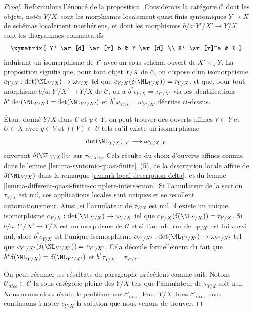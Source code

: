 \begin{proof}
Reformulons l'énoncé de la proposition. Considérons la catégorie
$\mathcal{C}$ dont les objets, notés $Y/X$, sont les morphismes localement quasi-finis syntomiques
$Y \to X$ de schémas localement noethériens, et dont les morphismes
$b/a : Y'/X' \to Y/X$ sont les diagrammes commutatifs
$$
\xymatrix{
Y' \ar[d] \ar[r]_b & Y \ar[d] \\
X' \ar[r]^a & X
}
$$
induisant un isomorphisme de $Y'$ avec un sous-schéma ouvert de
$X' \times_X Y$. La proposition signifie que, pour tout objet
$Y/X$ de $\mathcal{C}$, on dispose d'un isomorphisme
$c_{Y/X} : \det(\NL_{Y/X}) \to \omega_{Y/X}$
tel que $c_{Y/X}(\delta(\NL_{Y/X})) = \tau_{Y/X}$,
et que, pour tout morphisme $b/a : Y'/X' \to Y/X$ de $\mathcal{C}$, on a
$b^*c_{Y/X} = c_{Y'/X'}$ via les identifications
$b^*\det(\NL_{Y/X}) = \det(\NL_{Y'/X'})$ et
$b^*\omega_{Y/X} = \omega_{Y'/X'}$ décrites ci-dessus.

\medskip\noindent
Étant donné $Y/X$ dans $\mathcal{C}$ et $y \in Y$, on peut trouver
des ouverts affines $V \subset Y$ et $U \subset X$ avec
$y \in V$ et $f(V) \subset U$
tels qu'il existe un isomorphisme
$$
\det(\NL_{Y/X})|_V \longrightarrow \omega_{Y/X}|_V
$$
envoyant $\delta(\NL_{Y/X})|_V$ sur $\tau_{Y/X}|_V$. Cela résulte
du choix d'ouverts affines comme dans le
lemme \ref{lemma-syntomic-quasi-finite}, (5), de la description
locale affine de $\delta(\NL_{Y/X})$ dans la
remarque \ref{remark-local-description-delta}, et du
lemme \ref{lemma-different-quasi-finite-complete-intersection}.
Si l'annulateur de la section $\tau_{Y/X}$ est nul, ces
applications locales sont uniques et se recollent automatiquement. Ainsi, si l'annulateur
de $\tau_{Y/X}$ est nul, il existe un unique isomorphisme
$c_{Y/X} : \det(\NL_{Y/X}) \to \omega_{Y/X}$ tel que
$c_{Y/X}(\delta(\NL_{Y/X})) = \tau_{Y/X}$.
Si $b/a : Y'/X' \to Y/X$ est un morphisme de $\mathcal{C}$
et si l'annulateur de $\tau_{Y'/X'}$ est lui aussi nul,
alors $b^*c_{Y/X}$ est l'unique isomorphisme
$c_{Y'/X'} : \det(\NL_{Y'/X'}) \to \omega_{Y'/X'}$ tel que
$c_{Y'/X'}(\delta(\NL_{Y'/X'})) = \tau_{Y'/X'}$.
Cela découle formellement du fait que
$b^*\delta(\NL_{Y/X}) = \delta(\NL_{Y'/X'})$ et
$b^*\tau_{Y/X} = \tau_{Y'/X'}$.

\medskip\noindent
On peut résumer les résultats du paragraphe précédent comme suit.
Notons $\mathcal{C}_{nice} \subset \mathcal{C}$ la
sous-catégorie pleine des $Y/X$ tels que l'annulateur de
$\tau_{Y/X}$ soit nul. Nous avons alors résolu le problème
sur $\mathcal{C}_{nice}$. Pour $Y/X$ dans $\mathcal{C}_{nice}$,
nous continuons à noter $c_{Y/X}$ la solution que nous venons de trouver.


\end{proof}
